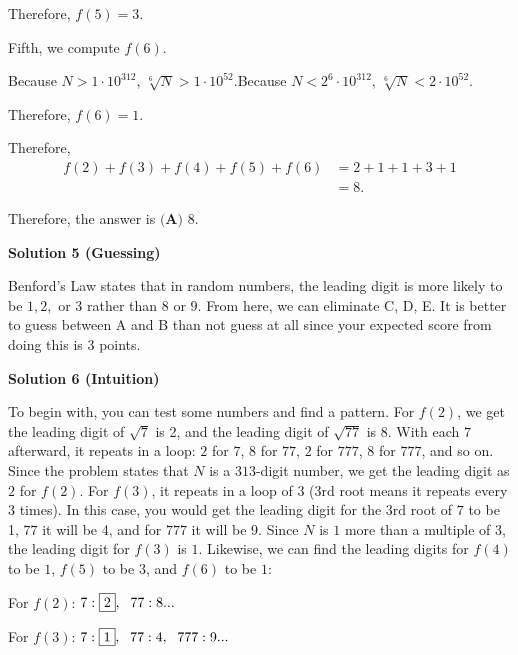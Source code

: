 \begin{enumerate}
 Therefore, $f \left( 5 \right) = 3$.

 Fifth, we compute $f \left( 6 \right)$.

 Because $N > 1 \cdot 10^{312}$, $\sqrt[6]{N} > 1 \cdot 10^{52}$.Because $N < 2^6 \cdot 10^{312}$, $\sqrt[6]{N} < 2 \cdot 10^{52}$.

 Therefore, $f \left( 6 \right) = 1$.

 Therefore,
 \begin{align*} f \left( 2 \right) + f \left( 3 \right) + f \left( 4 \right) + f \left( 5 \right) + f \left( 6 \right) & = 2 + 1 + 1 + 3 + 1 \\ & = 8 . \end{align*}


 Therefore, the answer is $\boxed{\textbf{(A) }8}$.

 



\textbf{Solution 5 (Guessing)}

Benford's Law states that in random numbers, the leading digit is more likely to be $1,2,$ or $3$ rather than $8$ or $9$. From here, we can eliminate C, D, E. It is better to guess between A and B than not guess at all since your expected score from doing this is $3$ points.

 



\textbf{Solution 6 (Intuition)}

To begin with, you can test some numbers and find a pattern. For $f(2)$, we get the leading digit of $\sqrt{7}$ is 2, and the leading digit of $\sqrt{77}$ is 8. With each $7$ afterward, it repeats in a loop: $2$ for $7$, $8$ for $77$, $2$ for $777$, $8$ for $777$, and so on. Since the problem states that $N$ is a $313$-digit number, we get the leading digit as $2$ for $f(2)$. For $f(3)$, it repeats in a loop of $3$ ($\text{3rd}$ root means it repeats every $3$ times). In this case, you would get the leading digit for the $\text{3rd}$ root of $7$ to be 1, $77$ it will be 4, and for $777$ it will be 9. Since $N$ is $1$ more than a multiple of 3, the leading digit for $f(3)$ is $1$. Likewise, we can find the leading digits for $f(4)$ to be $1$, $f(5)$ to be $3$, and $f(6)$ to be $1$:

 For $f(2)$: $7: \boxed{2},\hspace{0.085in} 77: 8 ...$

 For $f(3)$: $7: \boxed{1},\hspace{0.085in} 77: 4,\hspace{0.085in} 777: 9 ...$


\end{enumerate}
